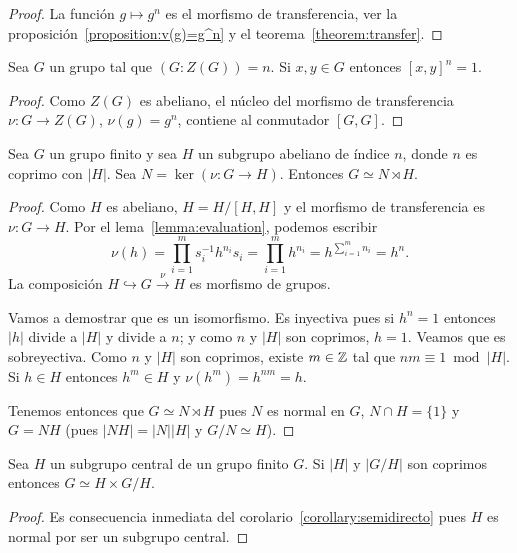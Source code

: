 \begin{proof}
	La función $g\mapsto g^n$ es el morfismo de transferencia, ver la
	proposición~\ref{proposition:v(g)=g^n} y el teorema~\ref{theorem:transfer}.
\end{proof}

\begin{corollary}
	\label{corollary:[x,y]^n=1}
	Sea $G$ un grupo tal que $(G:Z(G))=n$. Si $x,y\in G$ entonces $[x,y]^n=1$. 
\end{corollary}

\begin{proof}
	Como $Z(G)$ es abeliano, el núcleo del morfismo de transferencia $\nu\colon
	G\to Z(G)$, $\nu(g)=g^n$, contiene al conmutador $[G,G]$.
\end{proof}

\begin{corollary}
	\label{corollary:semidirecto}
	Sea $G$ un grupo finito y sea $H$ un subgrupo abeliano de
	índice $n$, donde $n$ es coprimo con $|H|$.  Sea
	$N=\ker(\nu\colon G\to H)$. Entonces $G\simeq N\rtimes H$.
\end{corollary}

\begin{proof}
	Como $H$ es abeliano, $H=H/[H,H]$ y el morfismo de transferencia es
	$\nu\colon G\to H$. Por el lema~\ref{lemma:evaluation}, podemos escribir
	\[
		\nu(h)
		=\prod_{i=1}^m s_i^{-1}h^{n_i}s_i
		=\prod_{i=1}^m h^{n_i}
		=h^{\sum_{i=1}^m n_i}=h^n.
	\]
	La composición $H\hookrightarrow G\xrightarrow{\nu} H$ es morfismo de
	grupos. 
	
	Vamos a demostrar que es un isomorfismo. Es inyectiva pues si $h^n=1$
	entonces $|h|$ divide a $|H|$ y divide a $n$; y como $n$ y $|H|$ son
	coprimos, $h=1$. Veamos que es sobreyectiva. Como $n$ y $|H|$ son coprimos,
	existe $m\in\mathbb{Z}$ tal que $nm\equiv 1\bmod |H|$. Si $h\in H$ entonces $h^m\in
	H$ y $\nu(h^m)=h^{nm}=h$. 

	Tenemos entonces que $G\simeq N\rtimes H$ pues $N$ es normal en $G$, $N\cap
	H=\{1\}$ y $G=NH$ (pues $|NH|=|N||H|$ y $G/N\simeq H$).
\end{proof}

\begin{corollary}[Frobenius]
	Sea $H$ un subgrupo central de un grupo finito $G$. Si $|H|$
	y $|G/H|$ son coprimos entonces $G\simeq H\times G/H$.
\end{corollary}

\begin{proof}
	Es consecuencia inmediata del corolario~\ref{corollary:semidirecto} pues
	$H$ es normal por ser un subgrupo central.
\end{proof}


